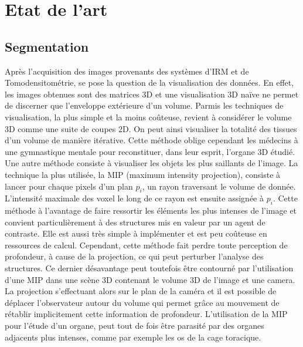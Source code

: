 %
\chapter{Etat de l'art}



\section{Segmentation}
\label{sec:EA:segmentation}


Après l'acquisition des images provenants des systèmes d'IRM et de Tomodensitométrie, se pose la question de la visualisation des données. En effet, les images obtenues sont des matrices 3D et une visualisation 3D naïve ne permet de discerner que l'enveloppe extérieure d'un volume. Parmis les techniques de visualisation, la plus simple et la moins coûteuse, revient à considérer le volume 3D comme une suite de coupes 2D. On peut ainsi visualiser la totalité des tissues d'un volume de manière itérative. Cette méthode oblige cependant les médecins à une gymnastique mentale pour reconstituer, dans leur esprit, l'organe 3D étudié. Une autre méthode consiste à visualiser les objets les plus saillants de l'image. La technique la plus utilisée, la MIP (maximum intensity projection), consiste à lancer pour chaque pixels d'un plan $p_i$, un rayon traversant le volume de donnée. L'intensité maximale des voxel le long de ce rayon est ensuite assignée à $p_i$. Cette méthode à l'avantage de faire ressortir les éléments les plus intenses de l'image et convient particulièrement à des structures mis en valeur par un agent de contraste. Elle est aussi très simple à implémenter et est peu coûteuse en ressources de calcul. Cependant, cette méthode fait perdre toute perception de profondeur, à cause de la projection, ce qui peut perturber l'analyse des structures. Ce dernier désavantage peut toutefois être contourné par l'utilisation d'une MIP dans une scène 3D contenant le volume 3D de l'image et une camera. La projection s'effectuant alors sur le plan de la caméra et il est possible de déplacer l'observateur autour du volume qui permet grâce au mouvement de rétablir implicitement cette information de profondeur. L'utilisation de la MIP pour l'étude d'un organe, peut tout de fois être parasité par des organes adjacents plus intenses, comme par exemple les os de la cage toracique.

